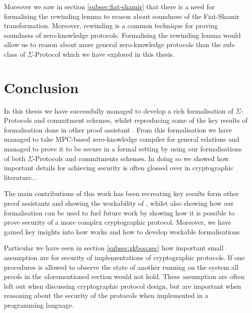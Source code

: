 Moreover we saw in section \ref{subsec:fiat-shamir} that there is a need for
formalising the rewinding lemma to reason about soundness of the Fiat-Shamir
transformation. Moreover, rewinding is a common technique for proving soundness
of zero-knowledge protocols. Formalising the rewinding lemma would allow
us to reason about more general zero-knowledge protocols than the sub-class of
$\Sigma$-Protocol which we have explored in this thesis.

\section{Conclusion}
\label{sec:conclusion}
\begin{draft}
In this thesis we have successfully managed to develop a rich formalisation of
$\Sigma$-Protocols and commitment schemes, whilst reproducing some of the key results of
formalisation done in other proof assistant \cite{cryptoeprint:2019:1185,certicrypt_sigma}.
From this formalisation we have managed to take MPC-based zero-knowledge
compiler for general relations and managed to prove it to be secure in a formal
setting by using our formalisations of both $\Sigma$-Protocols and commitments
schemes. In doing so we showed how important details for achieving security is
often glossed over in cryptographic literature...

The main contributions of this work has been recreating key results form other
proof assistants and showing the workability of \easycrypt, whilst also showing
how our formalisation can be used to fuel future work by showing how it is
possible to prove security of a more complex cryptographic protocol.
Moreover, we have gained key insights into how \easycrypt works and how to
develop workable formalisations

Particular we have seen in section \ref{subsec:zkboo:sec} how important small
assumption are for security of implementations of cryptographic protocols. If
one procedures is allowed to observe the state of another running on the system
all proofs in the aforementioned section would not hold. These assumption are
often left out when discussing cryptographic protocol design, but are important
when reasoning about the security of the protocols when implemented in a
programming language.
\end{draft}

